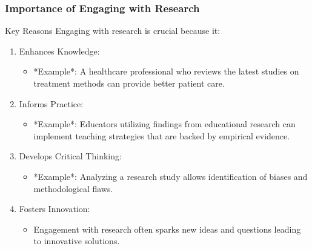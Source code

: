 \documentclass[aspectratio=169]{beamer}
\begin{document}
\begin{frame}[fragile]
    \frametitle{Importance of Engaging with Research}
    \begin{block}{Key Reasons}
        Engaging with research is crucial because it:
        \begin{enumerate}
            \item Enhances Knowledge:
                \begin{itemize}
                    \item *Example*: A healthcare professional who reviews the latest studies on treatment methods can provide better patient care.
                \end{itemize}
            \item Informs Practice:
                \begin{itemize}
                    \item *Example*: Educators utilizing findings from educational research can implement teaching strategies that are backed by empirical evidence.
                \end{itemize}
            \item Develops Critical Thinking:
                \begin{itemize}
                    \item *Example*: Analyzing a research study allows identification of biases and methodological flaws.
                \end{itemize}
            \item Fosters Innovation:
                \begin{itemize}
                    \item Engagement with research often sparks new ideas and questions leading to innovative solutions.
                \end{itemize}
        \end{enumerate}
    \end{block}
\end{frame}
\end{document}
